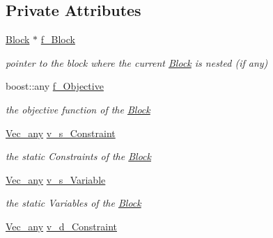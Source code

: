 \subsection*{Private Attributes}
\begin{DoxyCompactItemize}
\item 
\mbox{\label{class_s_m_spp__di__unipi__it_1_1_block_a372d458e214710b23cf375b9a6edc5fc}} 
\mbox{\hyperlink{class_s_m_spp__di__unipi__it_1_1_block}{Block}} $\ast$ \mbox{\hyperlink{class_s_m_spp__di__unipi__it_1_1_block_a372d458e214710b23cf375b9a6edc5fc}{f\+\_\+\+Block}}
\begin{DoxyCompactList}\small\item\em pointer to the block where the current \mbox{\hyperlink{class_s_m_spp__di__unipi__it_1_1_block}{Block}} is nested (if any) \end{DoxyCompactList}\item 
boost\+::any \mbox{\hyperlink{class_s_m_spp__di__unipi__it_1_1_block_a0c9ca72915ad1c6411af78dfd4a9b1a9}{f\+\_\+\+Objective}}
\begin{DoxyCompactList}\small\item\em the objective function of the \mbox{\hyperlink{class_s_m_spp__di__unipi__it_1_1_block}{Block}} \end{DoxyCompactList}\item 
\mbox{\hyperlink{group___s_m_s__types_ga58ded0963812566c064a5177b2f84c28}{Vec\+\_\+any}} \mbox{\hyperlink{class_s_m_spp__di__unipi__it_1_1_block_a6cbbe84709e83e48d4faab3ed8a8456a}{v\+\_\+s\+\_\+\+Constraint}}
\begin{DoxyCompactList}\small\item\em the static Constraints of the \mbox{\hyperlink{class_s_m_spp__di__unipi__it_1_1_block}{Block}} \end{DoxyCompactList}\item 
\mbox{\hyperlink{group___s_m_s__types_ga58ded0963812566c064a5177b2f84c28}{Vec\+\_\+any}} \mbox{\hyperlink{class_s_m_spp__di__unipi__it_1_1_block_a65a70f0d99265a81cd6ccbf35cf80d96}{v\+\_\+s\+\_\+\+Variable}}
\begin{DoxyCompactList}\small\item\em the static Variables of the \mbox{\hyperlink{class_s_m_spp__di__unipi__it_1_1_block}{Block}} \end{DoxyCompactList}\item 
\mbox{\hyperlink{group___s_m_s__types_ga58ded0963812566c064a5177b2f84c28}{Vec\+\_\+any}} \mbox{\hyperlink{class_s_m_spp__di__unipi__it_1_1_block_adbe2d40138adb5150da8553fdde5a88c}{v\+\_\+d\+\_\+\+Constraint}}

\end{DoxyCompactItemize}
